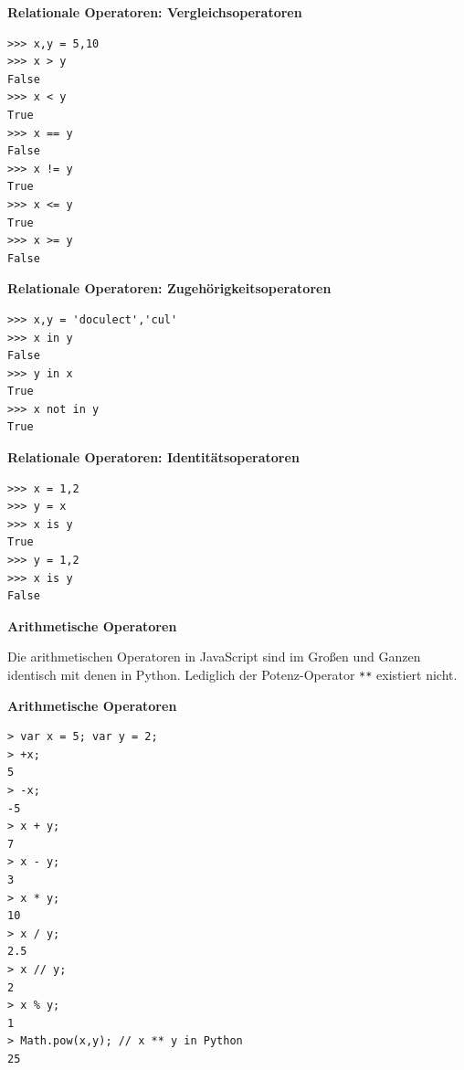 \vspace{0.5cm}\par\noindent\textbf{Relationale Operatoren: Vergleichsoperatoren}\vspace{0.5cm}

\begin{verbatim}
>>> x,y = 5,10
>>> x > y
False
>>> x < y
True
>>> x == y
False
>>> x != y
True
>>> x <= y
True
>>> x >= y
False
\end{verbatim}




\vspace{0.5cm}\par\noindent\textbf{Relationale Operatoren: Zugehörigkeitsoperatoren}\vspace{0.5cm}

\begin{verbatim}
>>> x,y = 'doculect','cul'
>>> x in y
False
>>> y in x
True
>>> x not in y
True
\end{verbatim}




\vspace{0.5cm}\par\noindent\textbf{Relationale Operatoren: Identitätsoperatoren}\vspace{0.5cm}

\begin{verbatim}
>>> x = 1,2
>>> y = x
>>> x is y
True
>>> y = 1,2
>>> x is y
False
\end{verbatim}




\vspace{0.5cm}\par\noindent\textbf{Arithmetische Operatoren}\vspace{0.5cm}

Die arithmetischen Operatoren in JavaScript sind im Großen und Ganzen
identisch mit denen in Python. Lediglich der Potenz-Operator \texttt{**}
existiert nicht.




\vspace{0.5cm}\par\noindent\textbf{Arithmetische Operatoren}\vspace{0.5cm}

\begin{verbatim}
> var x = 5; var y = 2;
> +x;
5
> -x;
-5
> x + y;
7
> x - y;
3
> x * y;
10
> x / y;
2.5
> x // y;
2
> x % y;
1
> Math.pow(x,y); // x ** y in Python
25
\end{verbatim}




